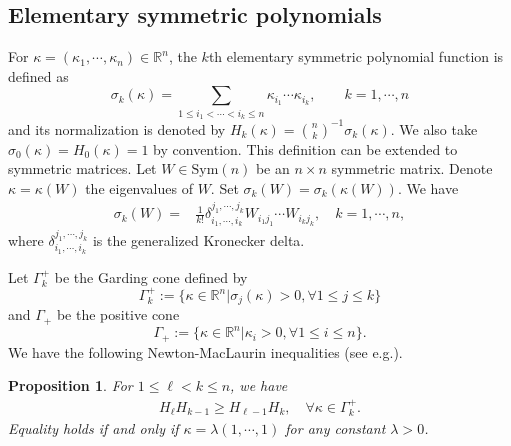 \documentclass[11pt,reqno]{amsart}
\newtheorem{prop}[thm]{Proposition}
\theoremstyle{definition}
\theoremstyle{remark}
\numberwithin{equation}{section}
\renewcommand{\(}{\left(}
\renewcommand{\)}{\right)}
\renewcommand{\-}{\overline}
\renewcommand{\k}{\kappa}
\renewcommand{\l}{\lambda}
\newcommand{\s}{\sigma}
\newcommand{\G}{\Gamma}
\begin{document}
\subsection{Elementary symmetric polynomials}
For $\kappa=(\kappa_1,\cdots,\kappa_n)\in \mathbb{R}^n$, the $k$th elementary symmetric polynomial function is defined as
\begin{equation*}
  \sigma_k(\kappa)=\sum_{1\leq i_1<\cdots <i_k\leq n}\kappa_{i_1}\cdots \kappa_{i_k},\qquad k=1,\cdots,n
\end{equation*}
and its normalization is denoted by $H_k(\k)=\binom{n}{k}^{-1}\s_k(\k)$. We also take $\s_0(\k)=H_0(\k)=1$ by convention. This definition can be extended to symmetric matrices. Let $W\in \mathrm{Sym}(n)$ be an $n\times n$ symmetric matrix. Denote $\kappa=\kappa(W)$ the eigenvalues of $W$. Set $\sigma_k(W)=\sigma_k(\kappa(W))$. We have
\begin{align*}
  \sigma_k(W) =& \frac{1}{k!}\delta_{i_1,\cdots,i_k}^{j_1,\cdots,j_k}W_{i_1j_1}\cdots W_{i_kj_k},\quad k=1,\cdots,n,
\end{align*}
where $\delta_{i_1,\cdots,i_k}^{j_1,\cdots,j_k}$ is the generalized Kronecker delta.


Let $\G_k^{+}$ be the Garding cone defined by
$$
\G_{k}^{+}:=\{\k\in\mathbb R^n|\sigma_j(\k)>0,\forall 1\leq j\leq k\}
$$
and $\Gamma_+$ be the positive cone
\begin{equation*}
  \Gamma_+:=\{\k\in\mathbb R^n|\kappa_i>0,\forall 1\leq i\leq n\}.
\end{equation*}
We have the following Newton-MacLaurin inequalities (see e.g.\cite[Lemma 2.5]{guan2014}).
\begin{prop}
	For $1\leq \ell<k \leq n$,  we have
	\begin{align}\label{s2:NM-ineq}
	H_\ell H_{k-1} \geq H_{\ell-1}H_k, \quad \forall \k\in \G_k^{+}.
	\end{align}
	Equality holds if and only if $\k=\l(1,\cdots,1)$ for any constant $\l>0$.
\end{prop}
\end{document}
